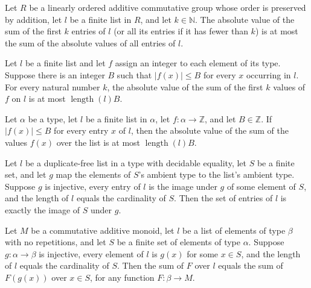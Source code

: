 \begin{theorem}
\label{List.abs_sum_take_le_sum_abs}
\leanok
{}
Let $R$ be a linearly ordered additive commutative group whose order is preserved by
addition, let $l$ be a finite list in $R$, and let $k\in\mathbb{N}$. The absolute value
of the sum of the first $k$ entries of $l$ (or all its entries if it has fewer than $k$)
is at most the sum of the absolute values of all entries of $l$.
\end{theorem}

\begin{theorem}
\label{List.abs_sum_take_map_le}
\leanok
{}
Let $l$ be a finite list and let $f$ assign an integer to each element of its type.
Suppose there is an integer $B$ such that $|f(x)|\le B$ for every $x$ occurring in $l$.
For every natural number $k$, the absolute value of the sum of the first $k$ values of
$f$ on $l$ is at most $\operatorname{length}(l)B$.
\end{theorem}

\begin{theorem}
\label{List.abs_sum_map_le}
\leanok
{}
Let $\alpha$ be a type, let $l$ be a finite list in $\alpha$, let
$f:\alpha\to\mathbb{Z}$, and let $B\in\mathbb{Z}$. If $|f(x)|\le B$ for every entry $x$
of $l$, then the absolute value of the sum of the values $f(x)$ over the list is at most
$\operatorname{length}(l)B$.
\end{theorem}

\begin{theorem}
\label{List.toFinset_eq_image_of_length_eq_card}
\leanok
{}
Let $l$ be a duplicate-free list in a type with decidable equality, let $S$ be a finite
set, and let $g$ map the elements of $S$'s ambient type to the list's ambient type.
Suppose $g$ is injective, every entry of $l$ is the image under $g$ of some element of
$S$, and the length of $l$ equals the cardinality of $S$. Then the set of entries of $l$
is exactly the image of $S$ under $g$.
\end{theorem}

\begin{theorem}
\label{List.sum_map_eq_sum_of_length_eq_card}
\leanok
{}
Let $M$ be a commutative additive monoid, let $l$ be a list of elements of type $\beta$
with no repetitions, and let $S$ be a finite set of elements of type $\alpha$. Suppose
$g:\alpha\to\beta$ is injective, every element of $l$ is $g(x)$ for some $x\in S$, and
the length of $l$ equals the cardinality of $S$. Then the sum of $F$ over $l$ equals the
sum of $F(g(x))$ over $x\in S$, for any function $F:\beta\to M$.
\end{theorem}

